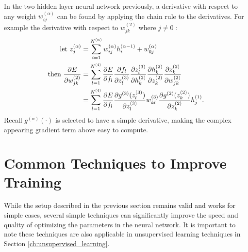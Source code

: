 In the two hidden layer neural network previously,
a derivative with respect to any weight 
$w_{ij}^{(\alpha)}$ can be found
by applying the chain rule to the derivatives.
For example the derivative with respect to $w_{jk}^{(2)}$ 
where $j \neq 0$ :
%
\begin{equation*}
\begin{aligned}
	\text{let } z_j^{(\alpha)} &= 
		\sum_{i=1}^{N^{(\alpha)}} w_{ij}^{(\alpha)} h_i^{(\alpha-1)}
      + w_{0j}^{(\alpha)} \\
	\text{then } \frac{\partial E}{\partial w_{jk}^{(2)}} &= 
		\sum_{l=1}^{N^{(4)}} \frac{\partial E}{\partial f_l}
		\frac{\partial f_l}{\partial z_l^{(3)}}
		\frac{\partial z_l^{(3)}}{\partial h_k^{(2)}}
		\frac{\partial h_k^{(2)}}{\partial z_k^{(2)}}
		\frac{\partial z_k^{(2)}}{\partial w_{jk}^{(2)}} \\
	&=
		\sum_{l=1}^{N^{(4)}} \frac{\partial E}{\partial f_l}
		\frac{\partial g^{(3)}(z_l^{(3)}) } {\partial z_l^{(3)}}
		w_{kl}^{(3)}
		\frac{\partial g^{(2)}(z_k^{(2)}) } {\partial z_k^{(2)}}
		h_j^{(1)} .
\end{aligned}
\end{equation*}
%
Recall $g^{(\alpha)}(\cdot)$ is selected to have a simple derivative,
making the complex appearing gradient term above easy to compute.

























\section{Common Techniques to Improve Training} \label{sc:tech}

\paragraph{}
While the setup described in the previous section
remains valid and works for simple cases,
several simple techniques can significantly 
improve the speed and quality of optimizing the parameters
in the neural network.
It is important to note these techniques are
also applicable in unsupervised learning techniques 
in Section \ref{ch:unsupervised_learning}.







